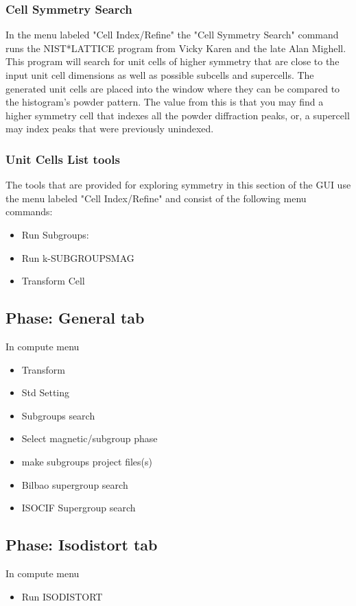 \subsubsection{Cell Symmetry Search}
In the menu labeled "Cell Index/Refine" the "Cell Symmetry Search" command runs the NIST*LATTICE program from Vicky Karen and the late Alan Mighell.
This program will search for unit cells of higher symmetry that are close to the input unit cell dimensions as well as possible subcells and supercells.
The generated unit cells are placed into the window where they can be compared to the histogram's powder pattern. 
The value from this is that you may find a higher symmetry cell that indexes all the powder diffraction peaks, or, a supercell may index peaks that were previously unindexed.

\subsubsection{Unit Cells List tools}
The tools that are provided for exploring symmetry in this section of the GUI use the menu labeled "Cell Index/Refine" and consist of the following menu commands: 

\begin{itemize}

    \item Run Subgroups: 
    \item Run k-SUBGROUPSMAG
    \item Transform Cell
    \end{itemize}

\subsection{Phase: General tab}
 In compute menu
\begin{itemize}
    \item Transform
    \item Std Setting
    \item Subgroups search
    \item Select magnetic/subgroup phase
    \item make subgroups project files(s)
    \item Bilbao supergroup search
    \item ISOCIF Supergroup search
\end{itemize}

\subsection{Phase: Isodistort tab}
 In compute menu
\begin{itemize}
    \item Run ISODISTORT
\end{itemize}

